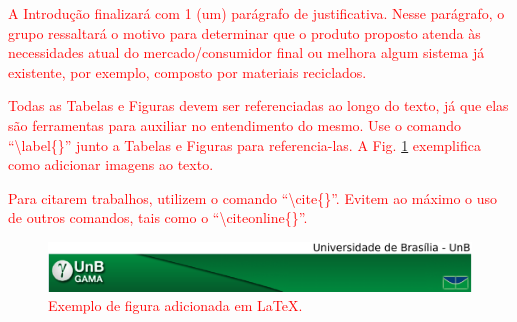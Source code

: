 \textcolor{red}{A Introdução finalizará com 1 (um) parágrafo de justificativa. Nesse parágrafo, o grupo ressaltará o motivo para determinar que o produto proposto atenda às necessidades atual do mercado/consumidor final ou melhora algum sistema já existente, por exemplo, composto por materiais reciclados.}

\textcolor{red}{Todas as Tabelas e Figuras devem ser referenciadas ao longo do texto, já que elas são ferramentas para auxiliar no entendimento do mesmo. Use o comando ``\textsf{\textbackslash label\{\}}'' junto a Tabelas e Figuras para referencia-las. A Fig. \ref{fig:exemplo_fig} exemplifica como adicionar imagens ao texto.}

\textcolor{red}{Para citarem trabalhos, utilizem o comando ``\textsf{\textbackslash cite\{\}}''. Evitem ao máximo o uso de outros comandos, tais como o ``\textsf{\textbackslash citeonline\{\}}''.}

\begin{figure}[htpb]
\centering
\includegraphics[width=\textwidth]{figuras/fga.png}
\caption{\textcolor{red}{Exemplo de figura adicionada em \LaTeX.}}
\label{fig:exemplo_fig}
\end{figure}



